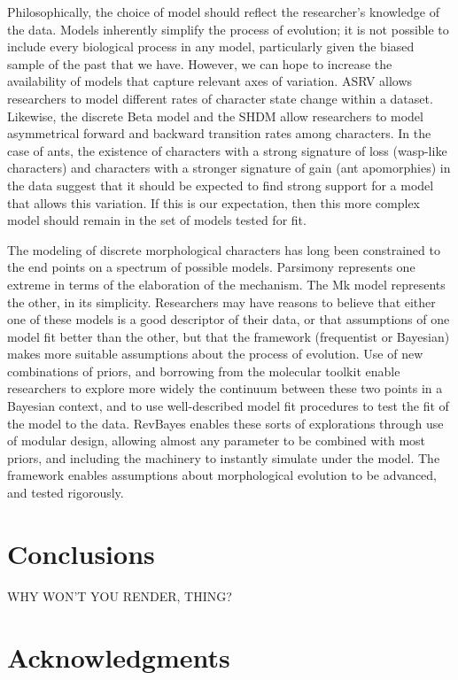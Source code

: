 \documentclass[]{article}
\begin{document}
Philosophically, the choice of model should reflect the researcher's knowledge of the data. 
Models inherently simplify the process of evolution; it is not possible to include every biological process in any model, particularly given the biased sample of the past that we have.
However, we can hope to increase the availability of models that capture relevant axes of variation. 
ASRV allows researchers to model different rates of character state change within a dataset.
Likewise, the discrete Beta model and the SHDM allow researchers to model asymmetrical forward and backward transition rates among characters. 
In the case of ants, the existence of characters with a strong signature of loss (wasp-like characters) and characters with a stronger signature of gain (ant apomorphies) in the data suggest that it should be expected to find strong support for a model that allows this variation.
If this is our expectation, then this more complex model should remain in the set of models tested for fit. \par
The modeling of discrete morphological characters has long been constrained to the end points on a spectrum of possible models. 
Parsimony represents one extreme in terms of the elaboration of the mechanism. 
The Mk model represents the other, in its simplicity.
Researchers may have reasons to believe that either one of these models is a good descriptor of their data, or that assumptions of one model fit better than the other, but that the framework (frequentist or Bayesian) makes more suitable assumptions about the process of evolution.
Use of new combinations of priors, and borrowing from the molecular toolkit enable researchers to explore more widely the continuum between these two points in a Bayesian context, and to use well-described model fit procedures to test the fit of the model to the data.
RevBayes enables these sorts of explorations through use of modular design, allowing almost any parameter to be combined with most priors, and including the machinery to instantly simulate under the model.
The framework enables assumptions about morphological evolution to be advanced, and tested rigorously.
 \par

\section{Conclusions}

WHY WON'T YOU RENDER, THING?


\section{Acknowledgments}
\end{document}
